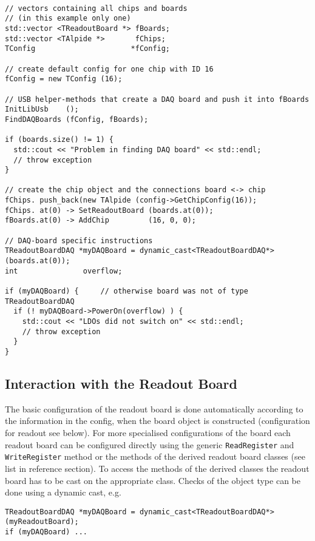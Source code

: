 \documentclass{article}
\begin{document}
\begin{verbatim}

// vectors containing all chips and boards 
// (in this example only one)
std::vector <TReadoutBoard *> fBoards;
std::vector <TAlpide *>       fChips;
TConfig                      *fConfig;

// create default config for one chip with ID 16
fConfig = new TConfig (16);
 
// USB helper-methods that create a DAQ board and push it into fBoards
InitLibUsb    ();
FindDAQBoards (fConfig, fBoards);
  
if (boards.size() != 1) { 
  std::cout << "Problem in finding DAQ board" << std::endl;
  // throw exception
}

// create the chip object and the connections board <-> chip
fChips. push_back(new TAlpide (config->GetChipConfig(16));
fChips. at(0) -> SetReadoutBoard (boards.at(0));
fBoards.at(0) -> AddChip         (16, 0, 0);

// DAQ-board specific instructions  
TReadoutBoardDAQ *myDAQBoard = dynamic_cast<TReadoutBoardDAQ*> (boards.at(0));
int               overflow;

if (myDAQBoard) {     // otherwise board was not of type TReadoutBoardDAQ
  if (! myDAQBoard->PowerOn(overflow) ) {
    std::cout << "LDOs did not switch on" << std::endl;
    // throw exception
  }
}
\end{verbatim}


\subsection{Interaction with the Readout Board}

The basic configuration of the readout board is done automatically
according to the information in the config, when the board object is
constructed (configuration for readout see below). For more
specialised configurations of the board  each readout board can be configured directly using the generic
\texttt{ReadRegister} and \texttt{WriteRegister} method or the
methods of the derived readout board classes (see list in
reference section). To access the methods of the derived classes the
readout board has to be cast on the appropriate class. Checks of the
object type can be done using a dynamic cast, e.g. 

\begin{verbatim}
TReadoutBoardDAQ *myDAQBoard = dynamic_cast<TReadoutBoardDAQ*>(myReadoutBoard);
if (myDAQBoard) ... 
\end{verbatim}
\end{document}
